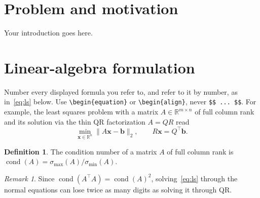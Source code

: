 \documentclass[11pt,a4paper]{article}
\newif\ifshowguide
\newcommand{\bR}{\mathbb{R}}
\newcommand{\bb}{\mathbf{b}}
\newcommand{\bx}{\mathbf{x}}
\DeclareMathOperator{\cond}{cond}
\theoremstyle{plain}
\theoremstyle{definition}
\newtheorem{definition}[theorem]{Definition}
\theoremstyle{remark}
\newtheorem{remark}[theorem]{Remark}
\newcommand{\guide}[1]{\ifshowguide\par\smallskip\noindent
  \colorbox{gray!12}{\parbox{\dimexpr\linewidth-2\fboxsep}{\small\itshape
  \textbf{Guidance.} #1}}\par\smallskip\fi}
\begin{document}
\section{Problem and motivation}
\label{sec:problem}

\guide{Criterion A. What goes in, what comes out, and why it matters in
practice. Who uses a solution to this problem, and what goes wrong
without a good one? Give a short overview of the approaches in the
literature and say which ones you chose and why.
\emph{Interim report 1}: half a page.}

Your introduction goes here.

\section{Linear-algebra formulation}
\label{sec:formulation}

\guide{Criterion A. State the problem precisely as a linear-algebra
problem: the matrix (its size, its entries, its structure: sparse,
symmetric, positive definite, low rank), the unknowns, and what you need
to do with the matrix. Explain why this structure suggests your methods.
\emph{Interim report 1}: this section is the core of the memo.}

Number every displayed formula you refer to, and refer to it by number,
as in~\eqref{eq:ls} below. Use \verb|\begin{equation}| or
\verb|\begin{align}|, never \verb|$$ ... $$|. For example, the least
squares problem with a matrix $A\in\bR^{m\times n}$ of full column rank
and its solution via the thin QR factorization $A=QR$ read
\begin{equation}\label{eq:ls}
  \min_{\bx\in\bR^n}\|A\bx-\bb\|_2,
  \qquad
  R\bx = Q^{\top}\bb .
\end{equation}

\begin{definition}\label{def:cond}
The condition number of a matrix $A$ of full column rank is
$\cond(A)=\sigma_{\max}(A)/\sigma_{\min}(A)$.
\end{definition}

\begin{remark}
Since $\cond(A^{\top}A)=\cond(A)^2$, solving~\eqref{eq:ls} through the
normal equations can lose twice as many digits as solving it through QR.
\end{remark}
\end{document}
